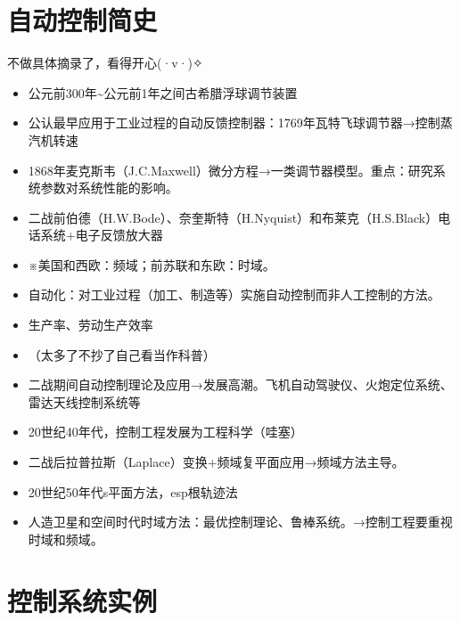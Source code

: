 \documentclass[oneside,a4paper]{ctexbook}
\begin{document}
\section{自动控制简史}
不做具体摘录了，看得开心(·v·)✧
\begin{itemize}
    \item 公元前300年\~{}公元前1年之间\phantom{哟}古希腊\phantom{嚯}浮球调节装置
    \item 公认最早应用于工业过程的自动反馈控制器：1769年\phantom{占}瓦特\phantom{位}飞球调节器→控制蒸汽机转速
    \item 1868年\phantom{的}麦克斯韦（J.C.Maxwell）\phantom{字}微分方程→一类调节器模型。重点：研究系统参数对系统性能的影响。
    \item 二战前\phantom{符}伯德（H.W.Bode）、奈奎斯特（H.Nyquist）和布莱克（H.S.Black）\phantom{一}电话系统+电子反馈放大器
    \item ※美国和西欧：频域；前苏联和东欧：时域。
    \item 自动化：对工业过程（加工、制造等）实施自动控制而非人工控制的方法。
    \item 生产率、劳动生产效率
    \item （太多了不抄了自己看当作科普）
    \item 二战期间\phantom{二}自动控制理论及应用→发展高潮。飞机自动驾驶仪、火炮定位系统、雷达天线控制系统等
    \item 20世纪40年代，控制工程发展为工程科学（哇塞）
    \item 二战后\phantom{一}拉普拉斯（Laplace）变换+频域复平面应用→频域方法主导。
    \item 20世纪50年代\phantom{字}s平面方法，esp根轨迹法
    \item 人造卫星和空间时代\phantom{一}时域方法：最优控制理论、鲁棒系统。→控制工程要重视时域和频域。
\end{itemize}

\section{控制系统实例}
\end{document}
